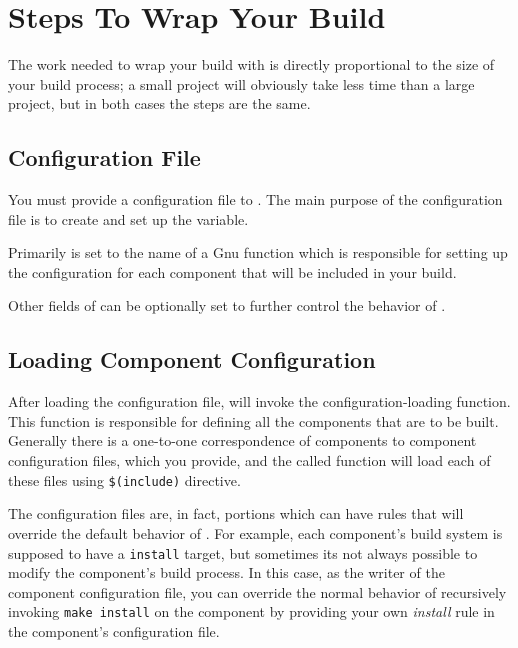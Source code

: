 \section{Steps To Wrap Your Build}

The work needed to wrap your build with \lmsbw is directly
proportional to the size of your build process; a small project will
obviously take less time than a large project, but in both cases the
steps are the same.

\subsection{Configuration File}

You must provide a configuration file to \lmsbw.  The main purpose of
the configuration file is to create and set up the \lmsbwconfiguration
variable.

Primarily  is set
to the name of a Gnu \make function which is responsible for setting
up the configuration for each component that will be included in your
build.

Other fields of \lmsbwconfiguration can be optionally set to further
control the behavior of \lmsbw.

\subsection{Loading Component Configuration}

After loading the configuration file, \lmsbw will invoke the
configuration-loading function.  This function is responsible for
defining all the components that are to be built.  Generally there is
a one-to-one correspondence of components to component configuration
files, which you provide, and the called function will load each of
these files using \gnumake \texttt{\$(include)}
directive.

The configuration files are, in fact, \makefile portions which can
have rules that will override the default behavior of \lmsbw.  For
example, each component's build system is supposed to have a
\texttt{install} target, but sometimes its not always possible to
modify the component's build process.  In this case, as the writer of
the component configuration file, you can override the normal \lmsbw
behavior of recursively invoking \texttt{make install} on the
component by providing your own \emph{install} rule in the component's
configuration file.

